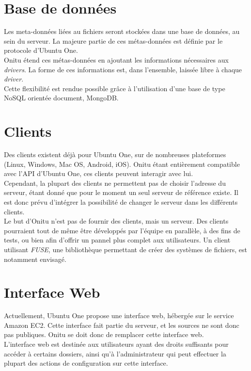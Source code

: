 \section{Base de données}
Les meta-données liées au fichiers seront stockées dans une base de données, au sein du serveur. La majeure partie de ces métas-données est définie par le protocole d'Ubuntu One.\\

Onitu étend ces métas-données en ajoutant les informations nécessaires aux \textit{drivers}. La forme de ces informations est, dans l'ensemble, laissée libre à chaque \textit{driver}.\\

Cette flexibilité est rendue possible grâce à l'utilisation d'une base de type NoSQL orientée document, MongoDB.

\section{Clients}
Des clients existent déjà pour Ubuntu One, sur de nombreuses plateformes (Linux, Windows, Mac OS, Android, iOS). Onitu étant entièrement compatible avec l'API d'Ubuntu One, ces clients peuvent interagir avec lui.\\

Cependant, la plupart des clients ne permettent pas de choisir l'adresse du serveur, étant donné que pour le moment un seul serveur de référence existe. Il est donc prévu d'intégrer la possibilité de changer le serveur dans les différents clients.\\

Le but d'Onitu n'est pas de fournir des clients, mais un serveur. Des clients pourraient tout de même être développés par l'équipe en parallèle, à des fins de tests, ou bien afin d'offrir un pannel plus complet aux utilisateurs. Un client utilisant \textit{FUSE}, une bibliothèque permettant de créer des systèmes de fichiers, est notamment envisagé.\\

\section{Interface Web}
Actuellement, Ubuntu One propose une interface web, hébergée sur le service Amazon EC2. Cette interface fait partie du serveur, et les sources ne sont donc pas publiques.
Onitu se doit donc de remplacer cette interface web.\\

L'interface web est destinée aux utilisateurs ayant des droits suffisants pour accéder à certains dossiers, ainsi qu'à l'administrateur qui peut effectuer la plupart des actions de configuration sur cette interface.\\

